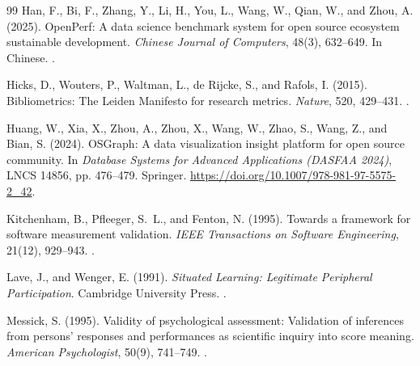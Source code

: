 \begin{thebibliography}{99}
Han, F., Bi, F., Zhang, Y., Li, H., You, L., Wang, W., Qian, W., and Zhou, A. (2025).
OpenPerf: A data science benchmark system for open source ecosystem sustainable development.
\emph{Chinese Journal of Computers}, 48(3), 632--649. In Chinese.
.

Hicks, D., Wouters, P., Waltman, L., de Rijcke, S., and Rafols, I. (2015).
Bibliometrics: The Leiden Manifesto for research metrics.
\emph{Nature}, 520, 429--431.
.

Huang, W., Xia, X., Zhou, A., Zhou, X., Wang, W., Zhao, S., Wang, Z., and Bian, S. (2024).
OSGraph: A data visualization insight platform for open source community.
In \emph{Database Systems for Advanced Applications (DASFAA 2024)}, LNCS 14856, pp. 476--479. Springer.
\url{https://doi.org/10.1007/978-981-97-5575-2_42}.

Kitchenham, B., Pfleeger, S.~L., and Fenton, N. (1995).
Towards a framework for software measurement validation.
\emph{IEEE Transactions on Software Engineering}, 21(12), 929--943.
.

Lave, J., and Wenger, E. (1991).
\emph{Situated Learning: Legitimate Peripheral Participation}. Cambridge University Press.
.

Messick, S. (1995).
Validity of psychological assessment: Validation of inferences from persons' responses and performances as scientific inquiry into score meaning.
\emph{American Psychologist}, 50(9), 741--749.
.

\end{thebibliography}
\clearpage
\begingroup
\renewcommand{\bibsection}{\section*{References\enspace{\normalfont\sffamily\fontsize{11}{14}\selectfont continued}}}
